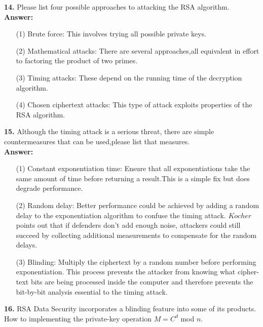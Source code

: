 \documentclass[paper=a4, fontsize=11pt]{scrartcl} %
\numberwithin{equation}{section} %
\numberwithin{figure}{section} %
\numberwithin{table}{section} %
\begin{document}
 \textbf{14.} Please list four possible approaches to attacking the RSA algorithm.\\

 \textbf{Answer:}

 \begin{enumerate}
 \item[(1)] Brute force: This involves trying all possible private keys.
 \item[(2)] Mathematical attacks: There are several approaches,all equivalent in effort to factoring the product of two primes.
 \item[(3)] Timing attacks: These depend on the running time of the decryption algorithm.
 \item[(4)] Chosen ciphertext attacks: This type of attack exploits properties of the RSA algorithm.\\
 \end{enumerate}



 \textbf{15.} Although the timing attack is a serious threat, there are simple countermeasures that can be used,please list that measures.\\

 \textbf{Answer:}

 \begin{enumerate}
 \item[(1)] Constant exponentiation time: Ensure that all exponentiations take the same amount of time before returning a result.This is a simple fix but does degrade performance.
 \item[(2)] Random delay: Better performance could be achieved by adding a random delay to the exponentiation algorithm to confuse the timing attack. $Kocher$ points out that if defenders don't add enough noise, attackers could still succeed by collecting additional measurements to compensate for the random delays.
 \item[(3)] Blinding: Multiply the ciphertext by a random number before performing exponentiation. This process prevents the attacker from knowing what cipher-text bits are being processed inside the computer and therefore prevents the bit-by-bit analysis essential to the timing attack.\\
 \end{enumerate}




 \textbf{16.} RSA Data Security incorporates a blinding feature into some of its products. How to implementing the private-key operation $M = C^{d}$ mod $n$.\\
\end{document}

